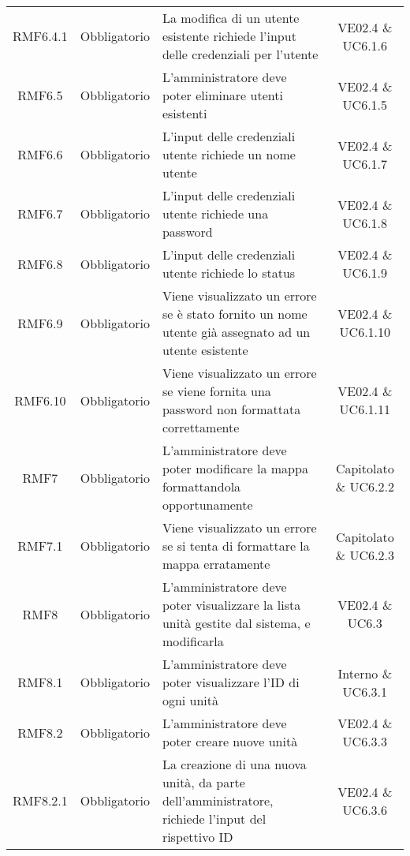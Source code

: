 \begin{longtable}[h!] { c c m{8cm} c}
		RMF6.4.1 & Obbligatorio & La modifica di un utente esistente richiede l'input delle credenziali per l'utente & VE02.4 \& UC6.1.6 \\
		
		RMF6.5 & Obbligatorio & L'amministratore deve poter eliminare utenti esistenti & VE02.4 \& UC6.1.5 \\
		
		RMF6.6 & Obbligatorio & L'input delle credenziali utente richiede un nome utente & VE02.4 \& UC6.1.7 \\
		
		RMF6.7 & Obbligatorio & L'input delle credenziali utente richiede una password & VE02.4 \& UC6.1.8 \\
		
		RMF6.8 & Obbligatorio & L'input delle credenziali utente richiede lo status & VE02.4 \& UC6.1.9 \\
		
		RMF6.9 & Obbligatorio & Viene visualizzato un errore se è stato fornito un nome utente già assegnato ad un utente esistente & VE02.4 \& UC6.1.10 \\
		
		RMF6.10 & Obbligatorio & Viene visualizzato un errore se viene fornita una password non formattata correttamente & VE02.4 \& UC6.1.11 \\
		
		RMF7 & Obbligatorio & L'amministratore deve poter modificare la mappa formattandola opportunamente & Capitolato \& UC6.2.2 \\
		
		RMF7.1 & Obbligatorio & Viene visualizzato un errore se si tenta di formattare la mappa erratamente & Capitolato \& UC6.2.3 \\
		
		RMF8 & Obbligatorio & L'amministratore deve poter visualizzare la lista unità gestite dal sistema, e modificarla & VE02.4 \& UC6.3 \\
		
		RMF8.1 & Obbligatorio & L'amministratore deve poter visualizzare l'ID di ogni unità & Interno \& UC6.3.1 \\
		
		RMF8.2 & Obbligatorio & L'amministratore deve poter creare nuove unità & VE02.4 \& UC6.3.3 \\
		
		RMF8.2.1 & Obbligatorio & La creazione di una nuova unità, da parte dell'amministratore, richiede l'input del rispettivo ID & VE02.4 \& UC6.3.6 \\
		

\end{longtable}
